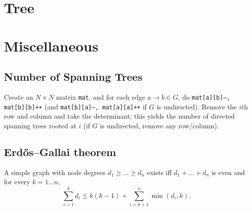 \section{Tree}

\section{Miscellaneous}
\subsection{Number of Spanning Trees}
Create an $N\times N$ matrix \texttt{mat}, and for each edge $a \rightarrow b
   \in G$, do \texttt{mat[a][b]--, mat[b][b]++} (and \texttt{mat[b][a]--,
   mat[a][a]++} if $G$ is undirected). Remove the $i$th row and column and take
the determinant; this yields the number of directed spanning trees rooted at
$i$ (if $G$ is undirected, remove any row/column).

\subsection{Erdős–Gallai theorem}
A simple graph with node degrees $d_1 \ge \dots \ge d_n$ exists iff $d_1 +
   \dots + d_n$ is even and for every $k = 1\dots n$,
\[ \sum _{i=1}^{k}d_{i}\leq k(k-1)+\sum _{i=k+1}^{n}\min(d_{i},k). \]